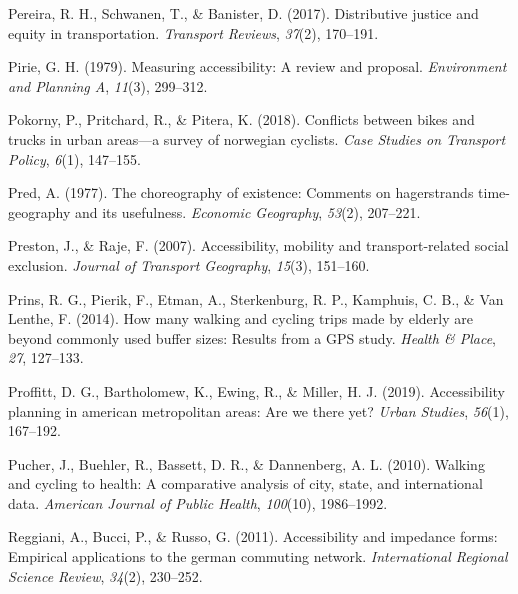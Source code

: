 \documentclass[12pt,twoside]{reedthesis}
\newlength{\cslhangindent}
\newenvironment{CSLReferences}[2] %
 {%
  \setlength{\parindent}{0pt}
  \ifodd #1 \everypar{\setlength{\hangindent}{\cslhangindent}}\ignorespaces\fi
  \ifnum #2 > 0
  \setlength{\parskip}{#2\baselineskip}
  \fi
 }%
 {}
\begin{document}
\begin{CSLReferences}{1}{0}
\leavevmode{}%
Pereira, R. H., Schwanen, T., \& Banister, D. (2017). Distributive justice and equity in transportation. \emph{Transport Reviews}, \emph{37}(2), 170--191.

\leavevmode{}%
Pirie, G. H. (1979). Measuring accessibility: A review and proposal. \emph{Environment and Planning A}, \emph{11}(3), 299--312.

\leavevmode{}%
Pokorny, P., Pritchard, R., \& Pitera, K. (2018). Conflicts between bikes and trucks in urban areas---a survey of norwegian cyclists. \emph{Case Studies on Transport Policy}, \emph{6}(1), 147--155.

\leavevmode{}%
Pred, A. (1977). The choreography of existence: Comments on hagerstrands time-geography and its usefulness. \emph{Economic Geography}, \emph{53}(2), 207--221.

\leavevmode{}%
Preston, J., \& Raje, F. (2007). Accessibility, mobility and transport-related social exclusion. \emph{Journal of Transport Geography}, \emph{15}(3), 151--160.

\leavevmode{}%
Prins, R. G., Pierik, F., Etman, A., Sterkenburg, R. P., Kamphuis, C. B., \& Van Lenthe, F. (2014). How many walking and cycling trips made by elderly are beyond commonly used buffer sizes: Results from a GPS study. \emph{Health \& Place}, \emph{27}, 127--133.

\leavevmode{}%
Proffitt, D. G., Bartholomew, K., Ewing, R., \& Miller, H. J. (2019). Accessibility planning in american metropolitan areas: Are we there yet? \emph{Urban Studies}, \emph{56}(1), 167--192.

\leavevmode{}%
Pucher, J., Buehler, R., Bassett, D. R., \& Dannenberg, A. L. (2010). Walking and cycling to health: A comparative analysis of city, state, and international data. \emph{American Journal of Public Health}, \emph{100}(10), 1986--1992.

\leavevmode{}%
Reggiani, A., Bucci, P., \& Russo, G. (2011). Accessibility and impedance forms: Empirical applications to the german commuting network. \emph{International Regional Science Review}, \emph{34}(2), 230--252.


\end{CSLReferences}
\end{document}
